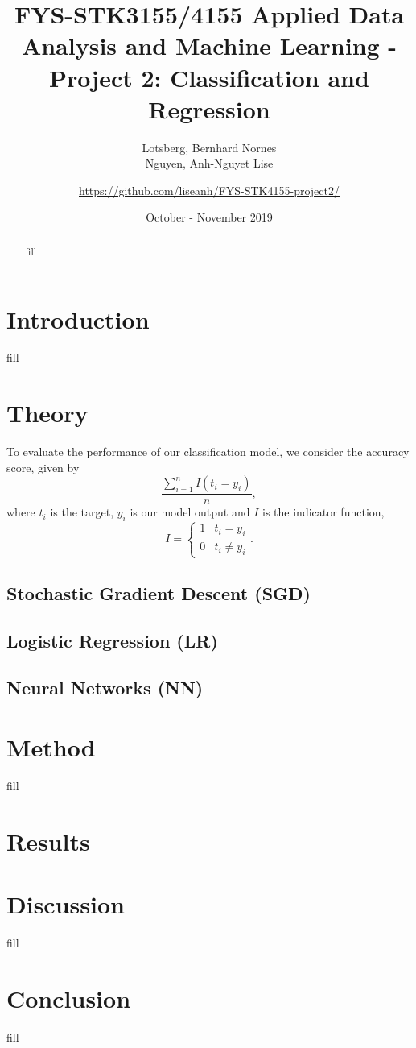 \documentclass[a4paper, 11pt, twocolumn]{article}
\title{FYS-STK3155/4155 Applied Data Analysis and Machine Learning - Project 2: Classification and Regression }
\author{Lotsberg, Bernhard Nornes \\ Nguyen, Anh-Nguyet Lise \and \url{https://github.com/liseanh/FYS-STK4155-project2/}}
\date{October - November 2019}
\begin{document}
\maketitle


\begin{abstract} \noindent
 fill
\end{abstract}

\section{Introduction}

fill


\section{Theory}
To evaluate the performance of our classification model, we consider the accuracy score, given by 
\begin{equation}
\label{eq:accuracy}
\frac{\sum_{i=1}^nI(t_i=y_i)}{n},
\end{equation}
where $t_i$ is the target, $y_i$ is our model output and $I$ is the indicator function, 
\[
I = \begin{cases} 
1 & t_i = y_i\\
0 & t_i \neq y_i
\end{cases} .
\]
\subsection{Stochastic Gradient Descent (SGD)}

\subsection{Logistic Regression (LR)}

\subsection{Neural Networks (NN)}
\section{Method}
fill



\section{Results}



\section{Discussion}
fill
\section{Conclusion}
fill


\end{document}

